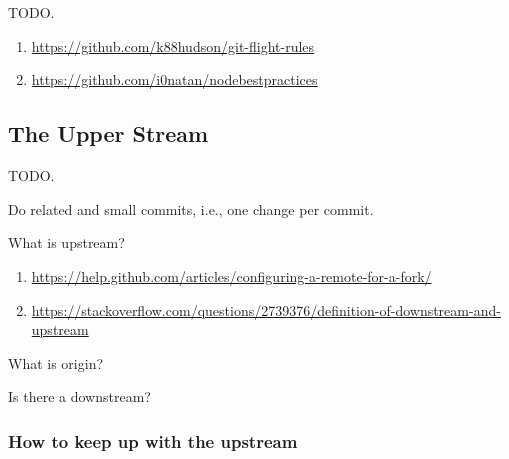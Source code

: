 

%


\chapter{}

    TODO.

    \begin{enumerate}[leftmargin=*]
        \item \url{https://github.com/k88hudson/git-flight-rules}
        \item \url{https://github.com/i0natan/nodebestpractices}
    \end{enumerate}


    \section{The Upper Stream}

    TODO.

    Do related and small commits, i.e., one change per commit.

    What is upstream?

    \begin{enumerate}[leftmargin=*]
        \item \url{https://help.github.com/articles/configuring-a-remote-for-a-fork/}
        \item \url{https://stackoverflow.com/questions/2739376/definition-of-downstream-and-upstream}
    \end{enumerate}


    What is origin?

    Is there a downstream?



    \subsection{How to keep up with the upstream}

